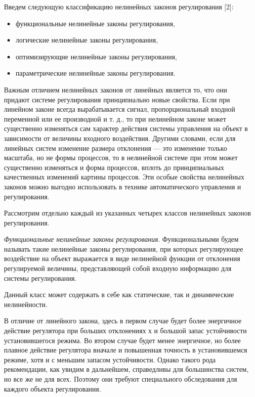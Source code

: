 Введем следующую классификацию нелинейных законов регулирования [2]:

\begin{itemize}
  \item функциональные нелинейные законы регулирования,
  \item логические нелинейные законы регулирования,
  \item оптимизирующие нелинейные законы регулирования,
  \item параметрические нелинейные законы регулирования.
\end{itemize}

Важным отличием нелинейных законов от линейных является то, что они придают системе регулирования принципиально новые свойства. Если при линейном законе всегда вырабатывается сигнал, пропорциональный входной переменной или ее производной и т. д., то при нелинейном законе может существенно изменяться сам характер действия системы управления на объект в зависимости от величины входного воздействия. Другими словами, если для линейных систем изменение размера отклонения — это изменение только масштаба, но не формы процессов, то в нелинейной системе при этом может существенно изменяться и форма процессов, вплоть до принципиальных качественных изменений картины процессов. Эти особые свойства нелинейных законов можно выгодно использовать в технике автоматического управления и регулирования.

Рассмотрим отдельно каждый из указанных четырех классов нелинейных законов регулирования.

\textit{Функциональные нелинейные законы регулирования}. Функциональными будем называть такие нелинейные законы регулирования, при которых регулирующее воздействие на объект выражается в виде нелинейной функции от отклонения регулируемой величины, представляющей собой входную информацию для системы регулирования.

Данный класс может содержать в себе как статические, так и динамические нелинейности. 

В отличие от линейного закона, здесь в первом случае будет более энергичное действие регулятора при больших отклонениях х и большой запас устойчивости установившегося режима. Во втором случае будет менее энергичное, но более плавное действие регулятора вначале и повышенная точность в установившемся режиме, хотя и с меньшим запасом устойчивости. Однако такого рода рекомендации, как увидим в дальнейшем, справедливы для большинства систем, но все же не для всех. Поэтому они требуют специального обследования для каждого объекта регулирования.

